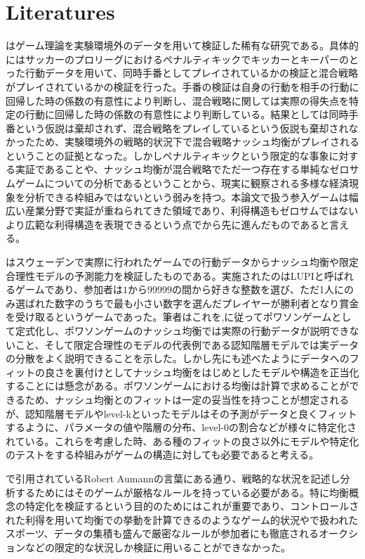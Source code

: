 
\section{Literatures}

\cite{Chiappori2002}はゲーム理論を実験環境外のデータを用いて検証した稀有な研究である。具体的にはサッカーのプロリーグにおけるペナルティキックでキッカーとキーパーのとった行動データを用いて、同時手番としてプレイされているかの検証と混合戦略がプレイされているかの検証を行った。手番の検証は自身の行動を相手の行動に回帰した時の係数の有意性により判断し、混合戦略に関しては実際の得失点を特定の行動に回帰した時の係数の有意性により判断している。結果としては同時手番という仮説は棄却されず、混合戦略をプレイしているという仮説も棄却されなかったため、実験環境外の戦略的状況下で混合戦略ナッシュ均衡がプレイされるということの証拠となった。しかしペナルティキックという限定的な事象に対する実証であることや、ナッシュ均衡が混合戦略でただ一つ存在する単純なゼロサムゲームについての分析であるということから、現実に観察される多様な経済現象を分析できる枠組みではないという弱みを持つ。本論文で扱う参入ゲームは幅広い産業分野で実証が重ねられてきた領域であり、利得構造もゼロサムではないより広範な利得構造を表現できるという点で\cite{Chiappori2002}から先に進んだものであると言える。

\cite{Ostling2011}はスウェーデンで実際に行われたゲームでの行動データからナッシュ均衡や限定合理性モデルの予測能力を検証したものである。実施されたのはLUPIと呼ばれるゲームであり、参加者は$1$から$99999$の間から好きな整数を選び、ただ1人にのみ選ばれた数字のうちで最も小さい数字を選んだプレイヤーが勝利者となり賞金を受け取るというゲームであった。筆者はこれを\cite{Myerson1998},\cite{Myerson2000}に従ってポワソンゲームとして定式化し、ポワソンゲームのナッシュ均衡では実際の行動データが説明できないこと、そして限定合理性のモデルの代表例である認知階層モデルでは実データの分散をよく説明できることを示した。しかし先にも述べたようにデータへのフィットの良さを裏付けとしてナッシュ均衡をはじめとしたモデルや構造を正当化することには懸念がある。ポワソンゲームにおける均衡は計算で求めることができるため、ナッシュ均衡とのフィットは一定の妥当性を持つことが想定されるが、認知階層モデルやlevel-kといったモデルはその予測がデータと良くフィットするように、パラメータの値や階層の分布、level-0の割合などが様々に特定化されている。これらを考慮した時、ある種のフィットの良さ以外にモデルや特定化のテストをする枠組みがゲームの構造に対しても必要であると考える。

\cite{Ostling2011}で引用されているRobert Aumannの言葉にある通り、戦略的な状況を記述し分析するためにはそのゲームが厳格なルールを持っている必要がある。特に均衡概念の特定化を検証するという目的のためにはこれが重要であり、コントロールされた利得を用いて均衡での挙動を計算できる\cite{Ostling2011}のようなゲーム的状況や\cite{Chiappori2002}で扱われたスポーツ、データの集積も盛んで厳密なルールが参加者にも徹底されるオークションなどの限定的な状況しか検証に用いることができなかった。

